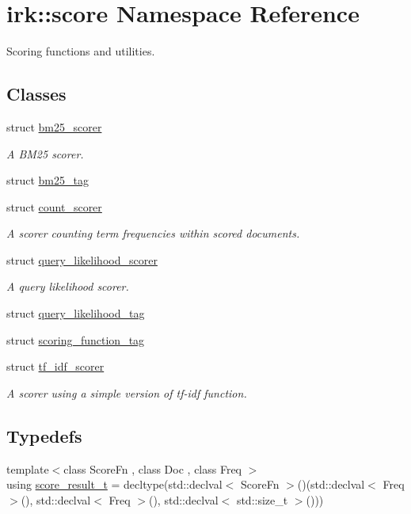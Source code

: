 \hypertarget{namespaceirk_1_1score}{}\section{irk\+:\+:score Namespace Reference}
\label{namespaceirk_1_1score}


Scoring functions and utilities.  


\subsection*{Classes}
\begin{DoxyCompactItemize}
\item 
struct \mbox{\hyperlink{structirk_1_1score_1_1bm25__scorer}{bm25\+\_\+scorer}}
\begin{DoxyCompactList}\small\item\em A B\+M25 scorer. \end{DoxyCompactList}\item 
struct \mbox{\hyperlink{structirk_1_1score_1_1bm25__tag}{bm25\+\_\+tag}}
\item 
struct \mbox{\hyperlink{structirk_1_1score_1_1count__scorer}{count\+\_\+scorer}}
\begin{DoxyCompactList}\small\item\em A scorer counting term frequencies within scored documents. \end{DoxyCompactList}\item 
struct \mbox{\hyperlink{structirk_1_1score_1_1query__likelihood__scorer}{query\+\_\+likelihood\+\_\+scorer}}
\begin{DoxyCompactList}\small\item\em A query likelihood scorer. \end{DoxyCompactList}\item 
struct \mbox{\hyperlink{structirk_1_1score_1_1query__likelihood__tag}{query\+\_\+likelihood\+\_\+tag}}
\item 
struct \mbox{\hyperlink{structirk_1_1score_1_1scoring__function__tag}{scoring\+\_\+function\+\_\+tag}}
\item 
struct \mbox{\hyperlink{structirk_1_1score_1_1tf__idf__scorer}{tf\+\_\+idf\+\_\+scorer}}
\begin{DoxyCompactList}\small\item\em A scorer using a simple version of tf-\/idf function. \end{DoxyCompactList}\end{DoxyCompactItemize}
\subsection*{Typedefs}
\begin{DoxyCompactItemize}
\item 
{\footnotesize template$<$class Score\+Fn , class Doc , class Freq $>$ }\\using \mbox{\hyperlink{namespaceirk_1_1score_af4a2c84b3548a4ac12aac3862bc94875}{score\+\_\+result\+\_\+t}} = decltype(std\+::declval$<$ Score\+Fn $>$()(std\+::declval$<$ Freq $>$(), std\+::declval$<$ Freq $>$(), std\+::declval$<$ std\+::size\+\_\+t $>$()))
\end{DoxyCompactItemize}


